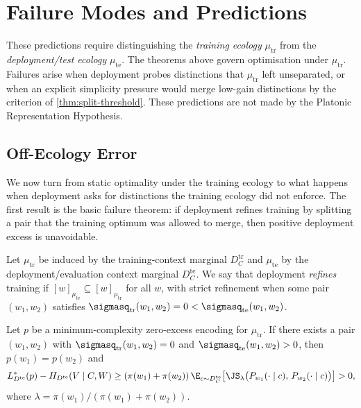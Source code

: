\section{Failure Modes and Predictions}\label{sec:failure}

These predictions require distinguishing the \emph{training ecology} $\mu_{\mathrm{tr}}$ from the \emph{deployment/test ecology} $\mu_{\mathrm{te}}$. The theorems above govern optimisation under $\mu_{\mathrm{tr}}$. Failures arise when deployment probes distinctions that $\mu_{\mathrm{tr}}$ left unseparated, or when an explicit simplicity pressure would merge low-gain distinctions by the criterion of \cref{thm:split-threshold}. These predictions are not made by the Platonic Representation Hypothesis.

\subsection{Off-Ecology Error}

We now turn from static optimality under the training ecology to what happens when deployment asks for distinctions the training ecology did not enforce. The first result is the basic failure theorem: if deployment refines training by splitting a pair that the training optimum was allowed to merge, then positive deployment excess is unavoidable.

\begin{definition}
Let $\mu_{\mathrm{tr}}$ be induced by the training-context marginal $D_C^{\mathrm{tr}}$ and $\mu_{\mathrm{te}}$ by the deployment/evaluation context marginal $D_C^{\mathrm{te}}$. We say that deployment \emph{refines} training if $[w]_{\mu_{\mathrm{te}}} \subseteq [w]_{\mu_{\mathrm{tr}}}$ for all $w$, with strict refinement when some pair $(w_1,w_2)$ satisfies $\sigmasq_{\mathrm{tr}}(w_1,w_2)=0 < \sigmasq_{\mathrm{te}}(w_1,w_2)$.
\end{definition}

\begin{proposition}\label{prop:off-ecology-error}
Let $p$ be a minimum-complexity zero-excess encoding for $\mu_{\mathrm{tr}}$. If there exists a pair $(w_1,w_2)$ with $\sigmasq_{\mathrm{tr}}(w_1,w_2)=0$ and $\sigmasq_{\mathrm{te}}(w_1,w_2)>0$, then $p(w_1)=p(w_2)$ and
\[
L_{D^{\mathrm{te}}}^*(p) - H_{D^{\mathrm{te}}}(V \mid C,W)
\ge (\pi(w_1)+\pi(w_2))\,
   \E_{c\sim D_C^{\mathrm{te}}}
   \!\left[\JS_{\lambda}
   \bigl(P_{w_1}(\cdot\mid c),\,P_{w_2}(\cdot\mid c)\bigr)\right]
> 0,
\]
where $\lambda=\pi(w_1)/(\pi(w_1)+\pi(w_2))$.
\end{proposition}


